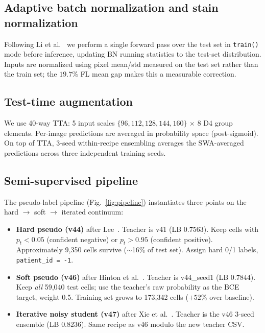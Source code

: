 \documentclass[conference]{IEEEtran}
\begin{document}
\subsection{Adaptive batch normalization and stain normalization}

Following Li et al.~\cite{li2016adabn} we perform a single forward pass over the test set in \texttt{train()} mode before inference, updating BN running statistics to the test-set distribution. Inputs are normalized using pixel mean/std measured on the test set rather than the train set; the $19.7\%$ FL mean gap makes this a measurable correction.

\subsection{Test-time augmentation}

We use 40-way TTA: 5 input scales $\{96, 112, 128, 144, 160\}$ $\times$ 8 D4 group elements. Per-image predictions are averaged in probability space (post-sigmoid). On top of TTA, 3-seed within-recipe ensembling averages the SWA-averaged predictions across three independent training seeds.

\subsection{Semi-supervised pipeline}

The pseudo-label pipeline (Fig.~\ref{fig:pipeline}) instantiates three points on the hard $\rightarrow$ soft $\rightarrow$ iterated continuum:

\begin{itemize}
  \item \textbf{Hard pseudo (v44)} after Lee~\cite{lee2013pseudo}. Teacher is v41 (LB $0.7563$). Keep cells with $p_t < 0.05$ (confident negative) or $p_t > 0.95$ (confident positive). Approximately 9{,}350 cells survive ($\sim$16\% of test set). Assign hard 0/1 labels, \texttt{patient\_id = -1}.
  \item \textbf{Soft pseudo (v46)} after Hinton et al.~\cite{hinton2015distilling}. Teacher is v44\_seed1 (LB $0.7844$). Keep \emph{all} 59{,}040 test cells; use the teacher's raw probability as the BCE target, weight 0.5. Training set grows to 173{,}342 cells ($+52\%$ over baseline).
  \item \textbf{Iterative noisy student (v47)} after Xie et al.~\cite{xie2020noisystudent}. Teacher is the v46 3-seed ensemble (LB $0.8236$). Same recipe as v46 modulo the new teacher CSV.
\end{itemize}
\end{document}
